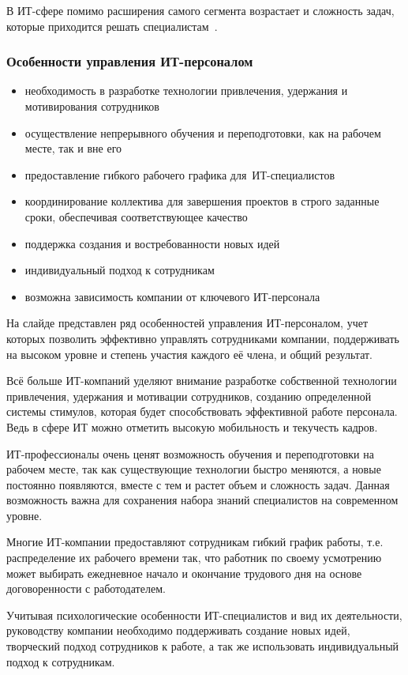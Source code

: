 \documentclass{../industrial-development}
\begin{document}
В ИТ-сфере помимо расширения самого сегмента возрастает и сложность задач, которые приходится решать специалистам~\cite{Bogatova}.

\begin{frame} \frametitle{Особенности управления ИТ-персоналом}
	\begin{itemize}
		\item необходимость в разработке технологии привлечения, удержания и мотивирования сотрудников
		\item осуществление непрерывного обучения и переподготовки, как на рабочем месте, так и вне его
		\item предоставление гибкого рабочего графика для~ИТ-специалистов
		\item координирование коллектива для завершения проектов в строго заданные сроки, обеспечивая соответствующее качество
		\item поддержка создания и востребованности новых идей
		\item индивидуальный подход к сотрудникам
		\item возможна зависимость компании от ключевого ИТ-персонала
	\end{itemize}
	
\end{frame}
\lecturenotes

На слайде представлен ряд особенностей управления ИТ-персоналом, учет которых позволить эффективно управлять сотрудниками компании, поддерживать на высоком уровне и степень участия каждого её члена, и общий результат.

Всё больше ИТ-компаний уделяют внимание разработке собственной технологии привлечения, удержания и мотивации сотрудников, созданию определенной системы стимулов, которая будет способствовать эффективной работе персонала. Ведь в сфере ИТ можно отметить высокую мобильность и текучесть кадров.

ИТ-профессионалы очень ценят возможность обучения и переподготовки на рабочем месте, так как существующие технологии быстро меняются, а новые постоянно появляются, вместе с тем и растет объем и сложность задач. Данная возможность важна для сохранения набора знаний специалистов на современном уровне. 

Многие ИТ-компании предоставляют сотрудникам гибкий график работы, т.е. распределение их рабочего времени так, что работник по своему усмотрению может выбирать ежедневное начало и окончание трудового дня на основе договоренности с работодателем.

Учитывая психологические особенности ИТ-специалистов и вид их деятельности, руководству компании необходимо поддерживать создание новых идей, творческий подход сотрудников к работе, а так же использовать индивидуальный подход к сотрудникам.
\end{document}
